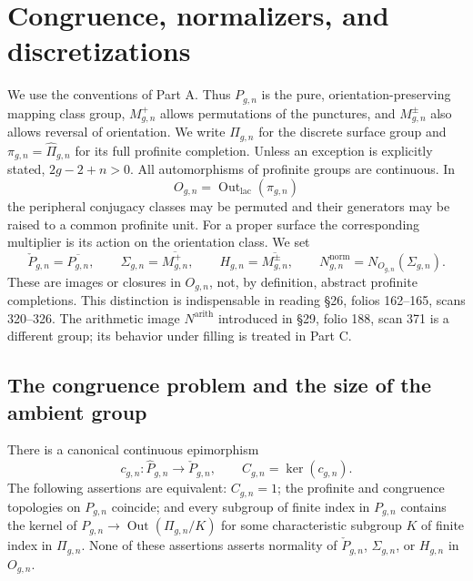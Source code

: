 \section{Congruence, normalizers, and discretizations}\label{part:B}

We use the conventions of Part A.  Thus $P_{g,n}$ is the pure,
orientation-preserving mapping class group, $M^+_{g,n}$ allows permutations
of the punctures, and $M^{\pm}_{g,n}$ also allows reversal of orientation.
We write $\Pi_{g,n}$ for the discrete surface group and
$\pi_{g,n}=\widehat{\Pi}_{g,n}$ for its full profinite completion.  Unless
an exception is explicitly stated, $2g-2+n>0$.  All automorphisms of
profinite groups are continuous.  In
\[
 O_{g,n}=\operatorname{Out}_{\mathrm{lac}}(\pi_{g,n})
\]
the peripheral conjugacy classes may be permuted and their generators
may be raised to a common profinite unit.  For a proper surface the
corresponding multiplier is its action on the orientation class.  We set
\[
 \check P_{g,n}=\overline{P_{g,n}},\qquad
 \Sigma_{g,n}=\overline{M^+_{g,n}},\qquad
 H_{g,n}=\overline{M^{\pm}_{g,n}},
 \qquad N^{\mathrm{norm}}_{g,n}=N_{O_{g,n}}(\Sigma_{g,n}).
\]
These are images or closures in $O_{g,n}$, not, by definition, abstract
profinite completions.  This distinction is indispensable in reading
\S26, folios 162--165, scans 320--326.  The arithmetic image
$N^{\mathrm{arith}}$ introduced in \S29, folio 188, scan 371 is a
different group; its behavior under filling is treated in Part C.

\subsection{The congruence problem and the size of the ambient group}

There is a canonical continuous epimorphism
\[
 c_{g,n}:\widehat P_{g,n}\longrightarrow\check P_{g,n},
 \qquad C_{g,n}=\ker(c_{g,n}).
\]
The following assertions are equivalent: $C_{g,n}=1$; the profinite and
congruence topologies on $P_{g,n}$ coincide; and every subgroup of finite
index in $P_{g,n}$ contains the kernel of
$P_{g,n}\to\operatorname{Out}(\Pi_{g,n}/K)$ for some characteristic
subgroup $K$ of finite index in $\Pi_{g,n}$.  None of these assertions
asserts normality of $\check P_{g,n}$, $\Sigma_{g,n}$, or $H_{g,n}$ in
$O_{g,n}$.

